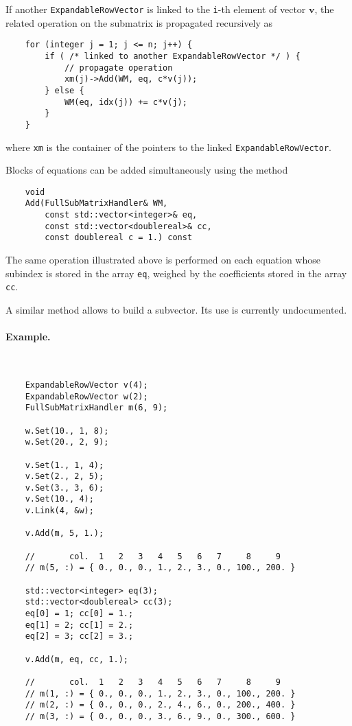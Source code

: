 \documentclass[10pt,dvips,fleqn,subeqn]{report}
\newcommand{\T}[1]{\bm{#1}}
\begin{document}
If another \texttt{ExpandableRowVector} is linked
to the \texttt{i}-th element of vector $\T{v}$,
the related operation on the submatrix is propagated recursively as
\begin{verbatim}
    for (integer j = 1; j <= n; j++) {
        if ( /* linked to another ExpandableRowVector */ ) {
            // propagate operation
            xm(j)->Add(WM, eq, c*v(j));
        } else {
            WM(eq, idx(j)) += c*v(j);
        }
    }
\end{verbatim}
where \texttt{xm} is the container of the pointers to the linked
\texttt{ExpandableRowVector}.

Blocks of equations can be added simultaneously using the method
\begin{verbatim}
    void
    Add(FullSubMatrixHandler& WM,
        const std::vector<integer>& eq,
        const std::vector<doublereal>& cc,
        const doublereal c = 1.) const
\end{verbatim}
The same operation illustrated above is performed on each equation
whose subindex is stored in the array \texttt{eq}, weighed by the
coefficients stored in the array \texttt{cc}.

A similar method allows to build a subvector.
Its use is currently undocumented.

\paragraph{Example.} \
\begin{verbatim}
    ExpandableRowVector v(4);
    ExpandableRowVector w(2);
    FullSubMatrixHandler m(6, 9);

    w.Set(10., 1, 8);
    w.Set(20., 2, 9);

    v.Set(1., 1, 4);
    v.Set(2., 2, 5);
    v.Set(3., 3, 6);
    v.Set(10., 4);
    v.Link(4, &w);

    v.Add(m, 5, 1.);

    //       col.  1   2   3   4   5   6   7     8     9
    // m(5, :) = { 0., 0., 0., 1., 2., 3., 0., 100., 200. }

    std::vector<integer> eq(3);
    std::vector<doublereal> cc(3);
    eq[0] = 1; cc[0] = 1.;
    eq[1] = 2; cc[1] = 2.;
    eq[2] = 3; cc[2] = 3.;

    v.Add(m, eq, cc, 1.);

    //       col.  1   2   3   4   5   6   7     8     9
    // m(1, :) = { 0., 0., 0., 1., 2., 3., 0., 100., 200. }
    // m(2, :) = { 0., 0., 0., 2., 4., 6., 0., 200., 400. }
    // m(3, :) = { 0., 0., 0., 3., 6., 9., 0., 300., 600. }
\end{verbatim}
\end{document}
